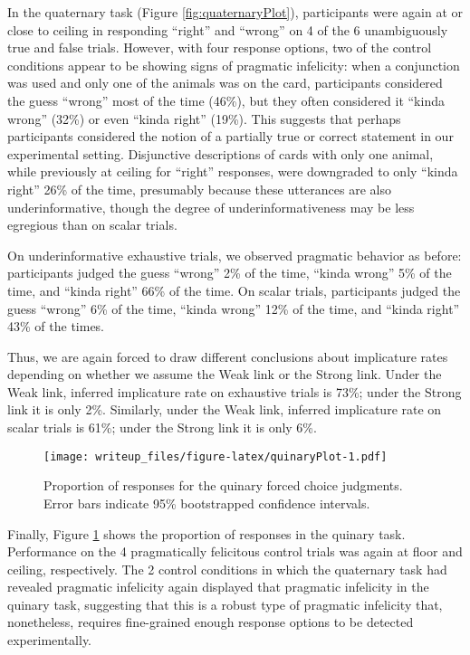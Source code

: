 \documentclass[man]{apa6}
\theoremstyle{definition}
\theoremstyle{definition}
\theoremstyle{definition}
\theoremstyle{remark}
\begin{document}
In the quaternary task (Figure \ref{fig:quaternaryPlot}), participants
were again at or close to ceiling in responding \enquote{right} and
\enquote{wrong} on 4 of the 6 unambiguously true and false trials.
However, with four response options, two of the control conditions
appear to be showing signs of pragmatic infelicity: when a conjunction
was used and only one of the animals was on the card, participants
considered the guess \enquote{wrong} most of the time (46\%), but they often
considered it \enquote{kinda wrong} (32\%) or even \enquote{kinda right} (19\%). This
suggests that perhaps participants considered the notion of a partially
true or correct statement in our experimental setting. Disjunctive
descriptions of cards with only one animal, while previously at ceiling
for \enquote{right} responses, were downgraded to only \enquote{kinda
right} 26\% of the time, presumably because these utterances are also
underinformative, though the degree of underinformativeness may be less
egregious than on scalar trials.

On underinformative exhaustive trials, we observed pragmatic behavior as
before: participants judged the guess \enquote{wrong} 2\% of the time,
\enquote{kinda wrong} 5\% of the time, and \enquote{kinda right} 66\% of
the time. On scalar trials, participants judged the guess
\enquote{wrong} 6\% of the time, \enquote{kinda wrong} 12\% of the time,
and \enquote{kinda right} 43\% of the times.

Thus, we are again forced to draw different conclusions about
implicature rates depending on whether we assume the Weak link or the
Strong link. Under the Weak link, inferred implicature rate on
exhaustive trials is 73\%; under the Strong link it is only 2\%.
Similarly, under the Weak link, inferred implicature rate on scalar
trials is 61\%; under the Strong link it is only 6\%.

\begin{figure}
\centering
\texttt{[image: writeup\_files/figure-latex/quinaryPlot-1.pdf]}
\caption{\label{fig:quinaryPlot}Proportion of responses for the quinary
forced choice judgments. Error bars indicate 95\% bootstrapped
confidence intervals.}
\end{figure}

Finally, Figure \ref{fig:quinaryPlot} shows the proportion of responses
in the quinary task. Performance on the 4 pragmatically felicitous
control trials was again at floor and ceiling, respectively. The 2
control conditions in which the quaternary task had revealed pragmatic
infelicity again displayed that pragmatic infelicity in the quinary
task, suggesting that this is a robust type of pragmatic infelicity
that, nonetheless, requires fine-grained enough response options to be
detected experimentally.
\end{document}

